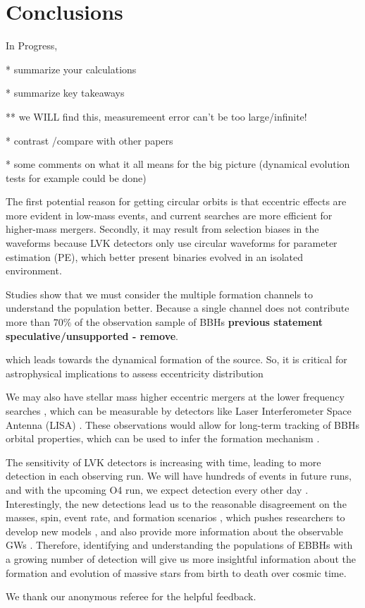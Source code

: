 \documentclass[twocolumn,prd,nofootinbib]{revtex4}
\begin{document}
\section{Conclusions}
\label{sec:conclude}
In Progress, 




* summarize your calculations

* summarize key takeaways

** we WILL find this, measuremeent error can't be too large/infinite!

* contrast /compare with other papers 

* some comments on what it all means for the big picture (dynamical evolution tests for example could be done)



The first potential reason for getting circular orbits is that eccentric effects are more evident in low-mass events, and current searches are more efficient for higher-mass mergers. Secondly, it may result from selection biases in the waveforms because LVK detectors only use circular waveforms for parameter estimation (PE), which better present binaries evolved in an isolated environment.


Studies show that we must consider the multiple formation channels to understand the population better. Because a single channel does not contribute more than $70\%$ of the observation sample of BBHs \cite{zevin-2021} \textbf{previous statement speculative/unsupported - remove}.

which leads towards the dynamical formation of the source. So, it is critical for astrophysical implications to assess eccentricity distribution


We may also have stellar mass higher eccentric mergers at the lower frequency searches \cite{sesana-2016,chen-2017}, which can be measurable by detectors like Laser Interferometer Space Antenna (LISA) \cite{LISA-2017}. These observations would allow for long-term tracking of BBHs orbital properties, which can be used to infer the formation mechanism \cite{Breivik-2016}.

The sensitivity of LVK detectors is increasing with time, leading to more detection in each observing run. We will have hundreds of events in future runs, and with the upcoming O4 run, we expect detection every other day \cite{detection_rate_2016,detection_rate_2015}. 
Interestingly, the new detections lead us to the reasonable disagreement on the masses, spin, event rate, and formation scenarios \cite{LSC-BBH-2016, LSC-GW150914-2016}, which pushes researchers to develop new models \cite{Mandel-2016,marchant-2016}, and also provide more information about the observable GWs \cite{Barausse-2018, Abbot-2016-schotastic,dvorkin-2016}. Therefore, identifying and understanding the populations of EBBHs with a growing number of detection will give us more insightful information about the formation and evolution of massive stars from birth to death over cosmic time.


\begin{acknowledgements}
We thank our anonymous referee for the helpful feedback.

\end{acknowledgements}







\end{document}

